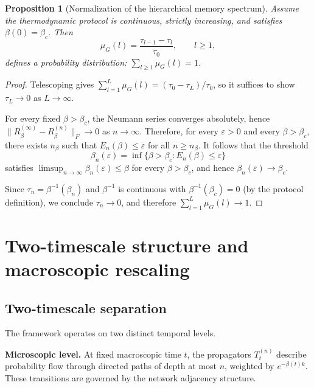 \documentclass[aps,superscriptaddress,11pt]{revtex4-2}
\newcommand{\Tn}{T^{(n)}_t}
\newtheorem{proposition}[theorem]{Proposition}
\theoremstyle{definition}
\theoremstyle{plain}
\begin{document}
\begin{proposition}[Normalization of the hierarchical memory spectrum]
\label{prop:hms_norm}
Assume the thermodynamic protocol is continuous, strictly increasing, and
satisfies $\beta(0)=\beta_c$. Then
\[
  \mu_G(l)
  =
  \frac{\tau_{l-1}-\tau_l}{\tau_0},
  \qquad l\geq1,
\]
defines a probability distribution: $\sum_{l\geq1}\mu_G(l)=1$.
\end{proposition}

\begin{proof}
Telescoping gives $\sum_{l=1}^{L}\mu_G(l) = (\tau_0-\tau_L)/\tau_0$,
so it suffices to show $\tau_L\to0$ as $L\to\infty$.

For every fixed $\beta>\beta_c$, the Neumann series converges absolutely,
hence $\|R_\beta^{(\infty)}-R_\beta^{(n)}\|_F\to0$ as $n\to\infty$.
Therefore, for every $\varepsilon>0$ and every $\beta>\beta_c$, there
exists $n_\beta$ such that $E_n(\beta)\leq\varepsilon$ for all
$n\geq n_\beta$. It follows that the threshold
\[
  \beta_n(\varepsilon)
  =
  \inf\{\beta>\beta_c:E_n(\beta)\leq\varepsilon\}
\]
satisfies $\limsup_{n\to\infty}\beta_n(\varepsilon)\leq\beta$ for every
$\beta>\beta_c$, and hence $\beta_n(\varepsilon)\to\beta_c$.

Since $\tau_n=\beta^{-1}(\beta_n)$ and $\beta^{-1}$ is continuous with
$\beta^{-1}(\beta_c)=0$ (by the protocol definition), we conclude
$\tau_n\to0$, and therefore $\sum_{l=1}^{L}\mu_G(l)\to1$.
\end{proof}

\section{Two-timescale structure and macroscopic rescaling}
\label{sec:twotimescale}

\subsection*{Two-timescale separation}

The framework operates on two distinct temporal levels.

\medskip\noindent\textbf{Microscopic level.}
At fixed macroscopic time $t$, the propagators $\Tn$ describe probability
flow through directed paths of depth at most $n$, weighted by
$e^{-\beta(t)k}$. These transitions are governed by the network adjacency
structure.
\end{document}

